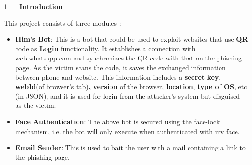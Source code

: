 \documentclass[12pt]{report}
\renewcommand{\_}{\kern-1.5pt\textunderscore\kern-1.5pt}
\begin{document}
\vspace{\baselineskip}

\vspace{\baselineskip}

\vspace{\baselineskip}

\vspace{\baselineskip}

\vspace{\baselineskip}

\vspace{\baselineskip}

\vspace{\baselineskip}
\begin{FlushLeft}
{\fontsize{18pt}{21.6pt}\selectfont \textbf{1\ \ \  Introduction }\par}
\end{FlushLeft}\par

\begin{FlushLeft}
This project consists of three modules :
\end{FlushLeft}\par

\begin{itemize}
	\item \textbf{Him’s Bot}: This is a bot that could be used to exploit websites that use \textbf{QR} code as \textbf{Login} functionality. It establishes a connection with web.whatsapp.com and synchronizes the QR code with that on the phishing page. As the victim scans the code, it saves the exchanged information between phone and website. This information includes a \textbf{secret key}, \textbf{webId}(of browser’s tab)\textbf{, version }of the browser, \textbf{location}, \textbf{type of OS}, etc (in JSON), and it is used for login from the attacker's system but disguised as the victim.\par

	\item \textbf{Face Authentication}: The above bot is secured using the face-lock mechanism, i.e. the bot will only execute when authenticated with my face.\par

	\item \textbf{Email Sender}: This is used to bait the user with a mail containing a link to the phishing page.
\end{itemize}\par
\end{document}
